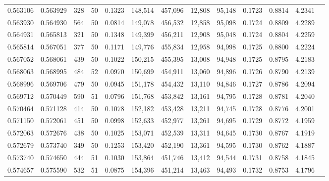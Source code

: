 \begin{tabular}{rrrrrrrrrrrrr}
0.563106 & 0.563929 &   328 &  50 &                                     0.1323 & 148,514 & 457,096 &  12,808 &  95,148 & 0.1723 & 0.8814 & 4.2341 \\
0.563930 & 0.564930 &   564 &  50 &                                     0.0814 & 149,078 & 456,532 &  12,858 &  95,098 & 0.1724 & 0.8809 & 4.2289 \\
0.564931 & 0.565813 &   321 &  50 &                                     0.1348 & 149,399 & 456,211 &  12,908 &  95,048 & 0.1724 & 0.8804 & 4.2259 \\
0.565814 & 0.567051 &   377 &  50 &                                     0.1171 & 149,776 & 455,834 &  12,958 &  94,998 & 0.1725 & 0.8800 & 4.2224 \\
0.567052 & 0.568061 &   439 &  50 &                                     0.1022 & 150,215 & 455,395 &  13,008 &  94,948 & 0.1725 & 0.8795 & 4.2183 \\
0.568063 & 0.568995 &   484 &  52 &                                     0.0970 & 150,699 & 454,911 &  13,060 &  94,896 & 0.1726 & 0.8790 & 4.2139 \\
0.568996 & 0.569706 &   479 &  50 &                                     0.0945 & 151,178 & 454,432 &  13,110 &  94,846 & 0.1727 & 0.8786 & 4.2094 \\
0.569712 & 0.570449 &   590 &  51 &                                     0.0796 & 151,768 & 453,842 &  13,161 &  94,795 & 0.1728 & 0.8781 & 4.2040 \\
0.570464 & 0.571128 &   414 &  50 &                                     0.1078 & 152,182 & 453,428 &  13,211 &  94,745 & 0.1728 & 0.8776 & 4.2001 \\
0.571150 & 0.572061 &   451 &  50 &                                     0.0998 & 152,633 & 452,977 &  13,261 &  94,695 & 0.1729 & 0.8772 & 4.1959 \\
0.572063 & 0.572676 &   438 &  50 &                                     0.1025 & 153,071 & 452,539 &  13,311 &  94,645 & 0.1730 & 0.8767 & 4.1919 \\
0.572679 & 0.573740 &   349 &  50 &                                     0.1253 & 153,420 & 452,190 &  13,361 &  94,595 & 0.1730 & 0.8762 & 4.1887 \\
0.573740 & 0.574650 &   444 &  51 &                                     0.1030 & 153,864 & 451,746 &  13,412 &  94,544 & 0.1731 & 0.8758 & 4.1845 \\
0.574657 & 0.575590 &   532 &  51 &                                     0.0875 & 154,396 & 451,214 &  13,463 &  94,493 & 0.1732 & 0.8753 & 4.1796 \\

\end{tabular}
